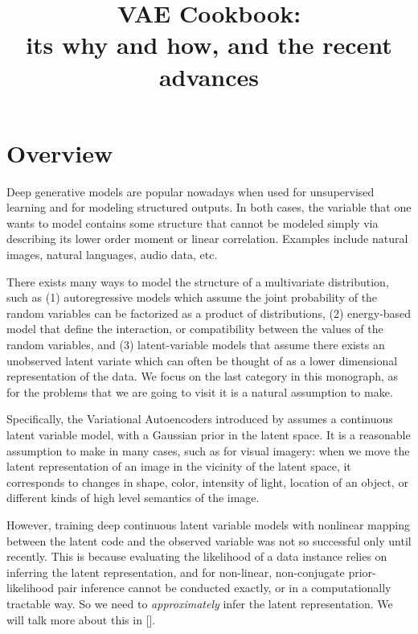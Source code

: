 \documentclass{article}
\title{VAE Cookbook: \\its why and how, and the recent advances}
\begin{document}
\maketitle


\tableofcontents
\newpage



\section{Overview}

Deep generative models are popular nowadays when used for unsupervised learning and for modeling structured outputs.
In both cases, the variable that one wants to model contains some structure that cannot be modeled simply via describing its lower order moment or linear correlation. 
Examples include natural images, natural languages, audio data, etc.

There exists many ways to model the structure of a multivariate distribution, such as (1) autoregressive models which assume the joint probability of the random variables can be factorized as a product of distributions, (2) energy-based model that define the interaction, or compatibility between the values of the random variables, and (3) latent-variable models  that assume there exists an unobserved latent variate which can often be thought of as a lower dimensional representation of the data.
We focus on the last category in this monograph, as for the problems that we are going to visit it is a natural assumption to make.

Specifically, the Variational Autoencoders introduced by \citet{kingma2013auto} assumes a continuous latent variable model, with a Gaussian prior in the latent space. 
It is a reasonable assumption to make in many cases, such as for visual imagery: when we move the latent representation of an image in the vicinity of the latent space, it corresponds to changes in shape, color, intensity of light, location of an object, or different kinds of high level semantics of the image. 

However, training deep continuous latent variable models with nonlinear mapping between the latent code and the observed variable was not so successful only until recently.
This is because evaluating the likelihood of a data instance relies on inferring the latent representation, and for non-linear, non-conjugate prior-likelihood pair inference cannot be conducted exactly, or in a computationally tractable way. 
So we need to \textit{approximately} infer the latent representation.
We will talk more about this in [].
\end{document}
